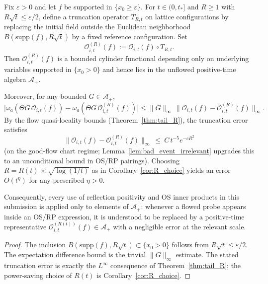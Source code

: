 \begin{lemma}\label{lem:RP_safe_flow_rep}
Fix $\varepsilon>0$ and let $f$ be supported in $\{x_0\ge \varepsilon\}$.
For $t\in(0,t_\ast]$ and $R\ge 1$ with $R\sqrt t\le \varepsilon/2$, define a truncation operator $T_{R,t}$ on lattice configurations
by replacing the initial field outside the Euclidean neighborhood $B(\mathrm{supp}(f),R\sqrt t)$ by a fixed reference configuration.
Set
\[
\mathcal O^{(R)}_{i,t}(f):=\mathcal O_{i,t}(f)\circ T_{R,t}.
\]
Then $\mathcal O^{(R)}_{i,t}(f)$ is a bounded cylinder functional depending only on underlying variables supported in $\{x_0>0\}$ and hence lies in the unflowed positive-time algebra $\mathcal A_+$.

Moreover, for any bounded $G\in\mathcal A_+$,
\[
\big|\omega_a(\Theta G\,\mathcal O_{i,t}(f)) - \omega_a(\Theta G\,\mathcal O^{(R)}_{i,t}(f))\big|
\le \|G\|_\infty\,\|\mathcal O_{i,t}(f)-\mathcal O^{(R)}_{i,t}(f)\|_\infty.
\]
By the flow quasi-locality bounds (Theorem~\ref{thm:tail_R}), the truncation error satisfies
\[
\|\mathcal O_{i,t}(f)-\mathcal O^{(R)}_{i,t}(f)\|_\infty\ \le\ C\,t^{-5}e^{-cR^2}
\]
(on the good-flow chart regime; Lemma~\ref{lem:bad_event_irrelevant} upgrades this to an unconditional bound in OS/RP pairings).
Choosing $R=R(t)\asymp\sqrt{\log(1/t)}$ as in Corollary~\ref{cor:R_choice} yields an error $O(t^\eta)$ for any prescribed $\eta>0$.

Consequently, every use of reflection positivity and OS inner products in this submission is applied only to elements of $\mathcal A_+$:
whenever a flowed probe appears inside an OS/RP expression, it is understood to be replaced by a positive-time representative
$\mathcal O^{(R(t))}_{i,t}(f)\in\mathcal A_+$ with a negligible error at the relevant scale.
\end{lemma}

\begin{proof}
The inclusion $B(\mathrm{supp}(f),R\sqrt t)\subset\{x_0>0\}$ follows from $R\sqrt t\le \varepsilon/2$.
The expectation difference bound is the trivial $\|G\|_\infty$ estimate.
The stated truncation error is exactly the $L^\infty$ consequence of Theorem~\ref{thm:tail_R}; the power-saving choice of $R(t)$ is Corollary~\ref{cor:R_choice}.
\end{proof}

